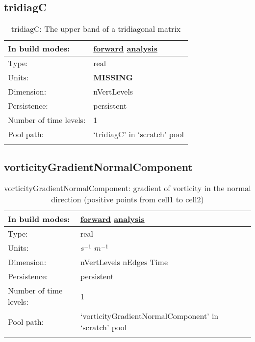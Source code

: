 \subsection[tridiagC]{tridiagC}
\label{subsec:var_sec_scratch_tridiagC}
\begin{center}
\begin{longtable}{| p{2.0in} | p{4.0in} |}
        \hline 
        In build modes: & \hyperref[subsec:forward_var_tab_scratch]{forward} \hyperref[subsec:analysis_var_tab_scratch]{analysis} \\
        \hline 
        Type: & real \\
        \hline 
        Units: & {\bf \color{red} MISSING} \\
        \hline 
        Dimension: & nVertLevels \\
        \hline 
        Persistence: & persistent \\
        \hline 
        Number of time levels: & 1 \\
        \hline 
            Pool path: & `tridiagC' in `scratch' pool \\
		 \hline 
    \caption{tridiagC: The upper band of a tridiagonal matrix}
\end{longtable}
\end{center}
\subsection[vorticityGradientNormalComponent]{vorticityGradientNormalComponent}
\label{subsec:var_sec_scratch_vorticityGradientNormalComponent}
\begin{center}
\begin{longtable}{| p{2.0in} | p{4.0in} |}
        \hline 
        In build modes: & \hyperref[subsec:forward_var_tab_scratch]{forward} \hyperref[subsec:analysis_var_tab_scratch]{analysis} \\
        \hline 
        Type: & real \\
        \hline 
        Units: & $s^{-1}$ $m^{-1}$ \\
        \hline 
        Dimension: & nVertLevels nEdges Time \\
        \hline 
        Persistence: & persistent \\
        \hline 
        Number of time levels: & 1 \\
        \hline 
            Pool path: & `vorticityGradientNormalComponent' in `scratch' pool \\
		 \hline 
    \caption{vorticityGradientNormalComponent: gradient of vorticity in the normal direction (positive points from cell1 to cell2)}
\end{longtable}
\end{center}
